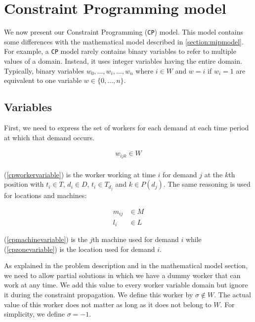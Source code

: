 \documentclass[../../thesis.tex]{subfiles}
\begin{document}
\section{Constraint Programming model}
\label{section:cpmodel}

We now present our Constraint Programming (\texttt{CP}) model. This model contains some differences
with the mathematical model described in \autoref{section:mipmodel}.
For example, a \texttt{CP} model rarely contains binary variables to refer to multiple values 
of a domain. Instead, it uses integer variables having the entire domain. 
Typically, binary variables $w_0, \dots, w_i, \dots, w_n$ where $i \in W$ and $w = i$ if $w_i = 1$ are equivalent to 
one variable $w \in \{0, \dots, n\}$.



\subsection{Variables}

First, we need to express the set of workers for each demand at each time period at which that demand occurs.

\begin{equation}
\begin{split}
    w_{ijk} \in W \label{cpworkervariable} \\
\end{split}
\end{equation}

(\ref{cpworkervariable}) is the worker working at time $i$ for demand $j$ at the $k$th position 
with $t_i \in T$, $d_i \in D$, $t_i \in T_{d_j}$ and $k \in P(d_j)$. The same reasoning is used for locations and machines:

\begin{align}
    m_{ij} &\in M \label{cpmachinevariable} \\ 
    l_i &\in L \label{cpzonevariable} 
\end{align}

(\ref{cpmachinevariable}) is the $j$th machine used for demand $i$ while (\ref{cpzonevariable}) is the location used for demand $i$.



As explained in the problem description and in the mathematical model section,
we need to allow partial solutions in which we have a dummy worker that can work at any time.
We add this value to every worker variable domain but ignore it during the constraint propagation. We define 
this worker by $\sigma \notin W$. The actual value of this worker does not matter as long as it does not belong to $W$. For simplicity, we define $\sigma = -1$.
\end{document}
